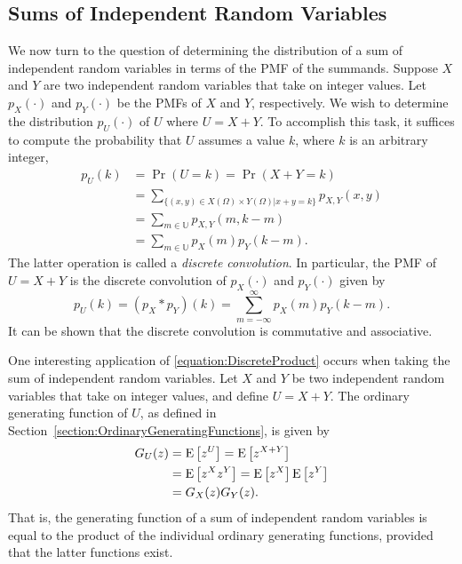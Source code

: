 \subsection{Sums of Independent Random Variables}

We now turn to the question of determining the distribution of a sum of independent random variables in terms of the PMF of the summands.
Suppose $X$ and $Y$ are two independent random variables that take on integer values.
Let $p_X(\cdot)$ and $p_Y(\cdot)$ be the PMFs of $X$ and $Y$, respectively.
We wish to determine the distribution $p_U (\cdot)$ of $U$ where $U = X + Y$.
To accomplish this task, it suffices to compute the probability that $U$ assumes a value $k$, where $k$ is an arbitrary integer,
\begin{equation*}
\begin{split}
p_U (k) &= \Pr (U = k) = \Pr (X + Y = k) \\
&= \sum_{ \{ (x,y) \in X(\Omega) \times Y(\Omega) | x + y = k \} } p_{X,Y} (x, y) \\
&= \sum_{ m \in \mathbb{U} } p_{X,Y} (m, k-m) \\
&= \sum_{ m \in \mathbb{U} } p_X (m) p_Y(k-m) .
\end{split}
\end{equation*}
The latter operation is called a \emph{discrete convolution}. 
In particular, the PMF of $U = X + Y$ is the discrete convolution of $p_X (\cdot)$ and $p_Y (\cdot)$ given by
\begin{equation} \label{equation:DiscreteConvolution}
p_U(k) = (p_X \ast p_Y)(k)
= \sum_{m = - \infty}^{\infty} p_X(m) p_Y(k-m) .
\end{equation}
It can be shown that the discrete convolution is commutative and associative.

One interesting application of \eqref{equation:DiscreteProduct} occurs when taking the sum of independent random variables.
Let $X$ and $Y$ be two independent random variables that take on integer values, and define $U = X + Y$.
The ordinary generating function of $U$, as defined in Section~\ref{section:OrdinaryGeneratingFunctions}, is given by
\begin{equation*}
\begin{split}
G_U (z) &= \mathrm{E} \left[ z^U \right]
= \mathrm{E} \left[ z^{X + Y} \right] \\
&= \mathrm{E} \left[ z^X z^Y \right]
= \mathrm{E} \left[ z^X \right] \mathrm{E} \left[ z^Y \right] \\
&= G_X(z) G_Y(z) .
\end{split}
\end{equation*}
That is, the generating function of a sum of independent random variables is equal to the product of the individual ordinary generating functions, provided that the latter functions exist.

